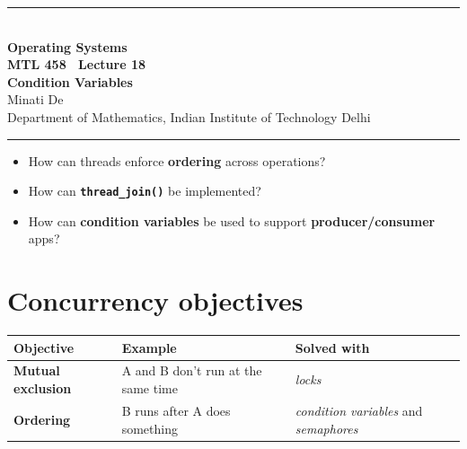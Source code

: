 \documentclass[11pt,a4paper]{article}
\begin{document}
\begin{center}
{\color{rulegray}\rule{\textwidth}{1.1pt}}\\[0.45em]
{\LARGE\bfseries Operating Systems}\\[0.25em]
{\Large\bfseries MTL 458 \textperiodcentered\ Lecture 18}\\[0.35em]
{\LARGE\bfseries Condition Variables}\\[0.35em]
{\large Minati De}\\[0.15em]
{\normalsize Department of Mathematics, Indian Institute of Technology Delhi}\\[0.35em]
{\color{rulegray}\rule{\textwidth}{1.1pt}}
\end{center}

\vspace{0.4em}
\begin{keybox}
\begin{itemize}
  \item How can threads enforce \textbf{ordering} across operations?
  \item How can \textbf{\texttt{thread\_join()}} be implemented?
  \item How can \textbf{condition variables} be used to support
        \textbf{producer/consumer} apps?
\end{itemize}
\end{keybox}

\tableofcontents
\vspace{0.6em}
\noindent{\color{rulegray}\rule{\textwidth}{0.4pt}}

\section{Concurrency objectives}

\begin{center}
\renewcommand{\arraystretch}{1.25}
\begin{tabularx}{\textwidth}{@{}lXl@{}}
  \toprule
  \textbf{Objective} & \textbf{Example} & \textbf{Solved with} \\
  \midrule
  \textbf{Mutual exclusion} & A and B don't run at the same time & \emph{locks} \\
  \textbf{Ordering} & B runs after A does something & \emph{condition variables} and \emph{semaphores} \\
  \bottomrule
\end{tabularx}
\end{center}
\end{document}
